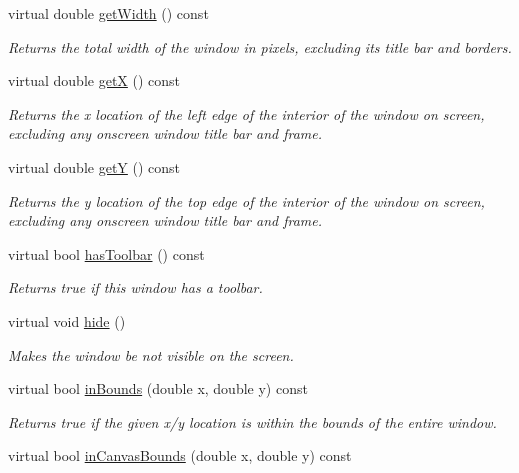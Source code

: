 \begin{DoxyCompactItemize}
virtual double \mbox{\hyperlink{classGWindow_a0ed2965abd4f5701d2cadf71239faf19}{get\+Width}} () const
\begin{DoxyCompactList}\small\item\em Returns the total width of the window in pixels, excluding its title bar and borders. \end{DoxyCompactList}\item 
virtual double \mbox{\hyperlink{classGWindow_a344385751bee0720059403940d57a13e}{getX}} () const
\begin{DoxyCompactList}\small\item\em Returns the x location of the left edge of the interior of the window on screen, excluding any onscreen window title bar and frame. \end{DoxyCompactList}\item 
virtual double \mbox{\hyperlink{classGWindow_aafa51c7f8f38a09febbb9ce7853f77b4}{getY}} () const
\begin{DoxyCompactList}\small\item\em Returns the y location of the top edge of the interior of the window on screen, excluding any onscreen window title bar and frame. \end{DoxyCompactList}\item 
virtual bool \mbox{\hyperlink{classGWindow_af69d0a7ce84cbbef65e40d861ef097c5}{has\+Toolbar}} () const
\begin{DoxyCompactList}\small\item\em Returns true if this window has a toolbar. \end{DoxyCompactList}\item 
virtual void \mbox{\hyperlink{classGWindow_ade42eb4da4eb77db85a8d1e4b92e7be4}{hide}} ()
\begin{DoxyCompactList}\small\item\em Makes the window be not visible on the screen. \end{DoxyCompactList}\item 
virtual bool \mbox{\hyperlink{classGWindow_afc480f652b8c5f1fb255e2269ce68879}{in\+Bounds}} (double x, double y) const
\begin{DoxyCompactList}\small\item\em Returns true if the given x/y location is within the bounds of the entire window. \end{DoxyCompactList}\item 
virtual bool \mbox{\hyperlink{classGWindow_ae94c9ea850cba190c985dae9fc120d32}{in\+Canvas\+Bounds}} (double x, double y) const

\end{DoxyCompactItemize}
